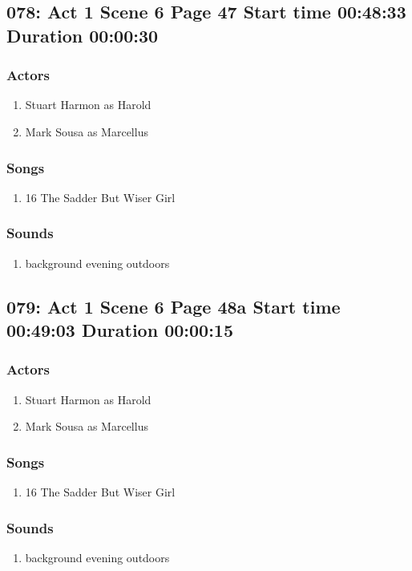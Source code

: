 \subsection{078: Act 1 Scene 6 Page 47 Start time 00:48:33 Duration 00:00:30}

\subsubsection{Actors}
\begin{enumerate}
\item Stuart Harmon as Harold
\item Mark Sousa as Marcellus
\end{enumerate}

\subsubsection{Songs}
\begin{enumerate}
\item 16 The Sadder But Wiser Girl
\end{enumerate}\subsubsection{Sounds}
\begin{enumerate}
\item background evening outdoors
\end{enumerate}
\subsection{079: Act 1 Scene 6 Page 48a Start time 00:49:03 Duration 00:00:15}

\subsubsection{Actors}
\begin{enumerate}
\item Stuart Harmon as Harold
\item Mark Sousa as Marcellus
\end{enumerate}

\subsubsection{Songs}
\begin{enumerate}
\item 16 The Sadder But Wiser Girl
\end{enumerate}\subsubsection{Sounds}
\begin{enumerate}
\item background evening outdoors
\end{enumerate}
